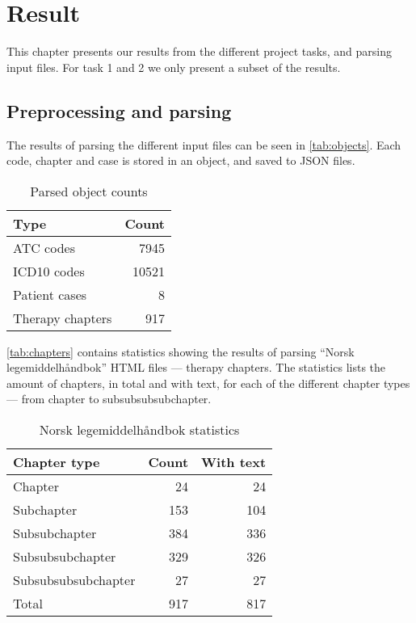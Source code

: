 \chapter{Result}
This chapter presents our results from the different project tasks, and
parsing input files. For task 1 and 2 we only present a subset of the results.


\section{Preprocessing and parsing}
The results of parsing the different input files can be seen in
\autoref{tab:objects}. Each code, chapter and case is stored in an object,
and saved to JSON files.
\begin{table}[htbp] \footnotesize \center
\caption{Parsed object counts\label{tab:objects}}
\begin{tabular}{l r}
    \toprule
    Type & Count \\
    \midrule
	ATC codes & 7945 \\
	ICD10 codes & 10521 \\
	Patient cases & 8 \\
	Therapy chapters & 917 \\
	\bottomrule
\end{tabular}
\end{table}

\autoref{tab:chapters} contains statistics showing the results of parsing
``Norsk legemiddelhåndbok'' HTML files --- therapy chapters. The statistics
lists the amount of chapters, in total and with text, for each of the
different chapter types --- from chapter to subsubsubsubchapter.
\begin{table}[htbp] \footnotesize \center
\caption{Norsk legemiddelhåndbok statistics\label{tab:chapters}}
\begin{tabular}{l r r}
    \toprule
    Chapter type & Count & With text \\
    \midrule
	Chapter & 24 & 24 \\
	Subchapter & 153 & 104 \\
	Subsubchapter & 384 & 336 \\
	Subsubsubchapter & 329 & 326 \\
	Subsubsubsubchapter & 27 & 27 \\
    \midrule
	Total & 917 & 817 \\
	\bottomrule
\end{tabular}
\end{table}

